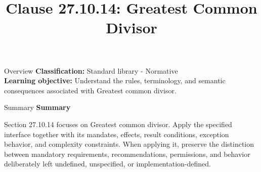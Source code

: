 \documentclass[10pt,letterpaper]{article}
\title{Clause 27.10.14: Greatest Common Divisor}
\author{}
\date{}
\begin{document}
\maketitle
\begin{CornellOverviewBox}{Overview}
\textbf{Classification:} Standard library - Normative\\[2pt]
\textbf{Learning objective:} Understand the rules, terminology, and semantic consequences associated with Greatest common divisor.
\end{CornellOverviewBox}\begin{CornellSummaryBox}{Summary}
{\sffamily\bfseries\color{Accent} Summary}\par\vspace{3pt}Section 27.10.14 focuses on Greatest common divisor. Apply the specified interface together with its mandates, effects, result conditions, exception behavior, and complexity constraints. When applying it, preserve the distinction between mandatory requirements, recommendations, permissions, and behavior deliberately left undefined, unspecified, or implementation-defined.
\end{CornellSummaryBox}
\end{document}

